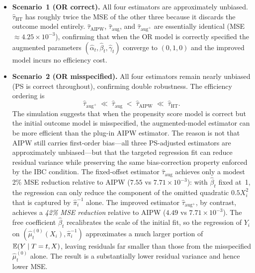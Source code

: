 \documentclass[master.tex]{subfiles}
\begin{document}
\begin{itemize}
  \item \textbf{Scenario~1 (OR correct).}  All four estimators are
    approximately unbiased.  $\hat\tau_{\mathrm{HT}}$ has roughly
    twice the MSE of the other three because it discards the outcome
    model entirely.  $\hat\tau_{\mathrm{AIPW}}$, $\hat\tau_{\mathrm{aug}}$,
    and $\hat\tau_{\mathrm{aug}^+}$ are essentially identical
    (MSE $\approx 4.25 \times 10^{-3}$), confirming that when the OR
    model is correctly specified the augmented parameters
    $(\hat\alpha_t, \hat\beta_t, \hat\gamma_t)$ converge to
    $(0, 1, 0)$ and the improved model incurs no efficiency cost.

  \item \textbf{Scenario~2 (OR misspecified).}  All four estimators
    remain nearly unbiased (PS is correct throughout), confirming
    double robustness.  The efficiency ordering is
    \[
      \hat\tau_{\mathrm{aug}^+} \;\ll\;
      \hat\tau_{\mathrm{aug}} \;<\;
      \hat\tau_{\mathrm{AIPW}} \;\ll\;
      \hat\tau_{\mathrm{HT}}.
    \]
    The simulation suggests that when the propensity score model is
    correct but the initial outcome model is misspecified, the
    augmented-model estimator can be more efficient than the plug-in
    AIPW estimator.  The reason is not that AIPW still carries
    first-order bias---all three PS-adjusted estimators are
    approximately unbiased---but that the targeted regression fit
    can reduce residual variance while preserving the same
    bias-correction property enforced by the IBC condition.
    The fixed-offset estimator $\hat\tau_{\mathrm{aug}}$ achieves
    only a modest 2\% MSE reduction relative to AIPW
    ($7.55$ vs $7.71 \times 10^{-3}$): with $\hat\beta_t$ fixed
    at~1, the regression can only reduce the component of the
    omitted quadratic $0.5X_i^2$ that is captured by $\hat\pi_i^{-1}$
    alone.  The improved estimator $\hat\tau_{\mathrm{aug}^+}$,
    by contrast, achieves a \emph{42\% MSE reduction} relative to AIPW
    ($4.49$ vs $7.71 \times 10^{-3}$).  The free coefficient
    $\hat\beta_t$ recalibrates the scale of the initial fit, so the
    regression of $Y_i$ on $(\hat\mu_t^{(0)}(X_i), \hat\pi_i^{-1})$
    approximates a much larger portion of $\mathbb{E}(Y\mid T=t, X)$, leaving
    residuals far smaller than those from the misspecified
    $\hat\mu_t^{(0)}$ alone.  The result is a substantially lower
    residual variance and hence lower MSE.
\end{itemize}
\end{document}
